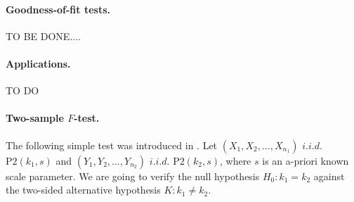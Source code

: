 \documentclass[11pt]{article}\usepackage{graphicx, color}
\newcommand{\hlfunctioncall}[1]{\textcolor[rgb]{0.501960784313725,0,0.329411764705882}{\textbf{#1}}}%
\newcommand{\Rfunc}[1]{\texttt{\hlfunctioncall{#1}}}
\theoremstyle{remark}
\theoremstyle{definition}
\begin{document}
\paragraph{Goodness-of-fit tests.}
TO BE DONE....
% 
% 
% 
% 


\paragraph{Applications.}
TO DO
% 
% 



\paragraph{Two-sample $F$-test.}
The following simple test was introduced in \cite{Gagolewski2011:PhD}.
Let
$(X_1,X_2,\dots,X_{n_1})$ $i.i.d.$ $\mathrm{P2}(k_1,s)$ and
$(Y_1,Y_2,\dots,Y_{n_2})$ $i.i.d.$ $\mathrm{P2}(k_2,s)$,
where $s$ is an a-priori known scale parameter.
We are going to verify the null hypothesis
$H_0: k_1=k_2$ against the two-sided alternative hypothesis
$K: k_1\neq k_2$.
\end{document}
